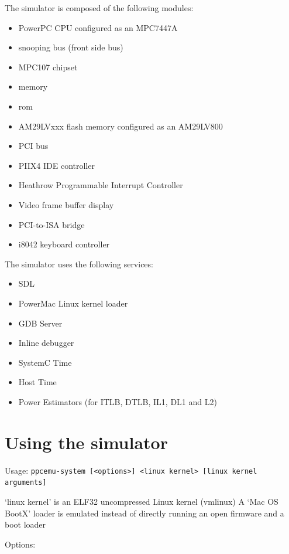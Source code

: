 The simulator is composed of the following modules:
\begin{itemize}\addtolength{\itemsep}{-0.40\baselineskip}
\item PowerPC CPU configured as an MPC7447A
\item snooping bus (front side bus)
\item MPC107 chipset
\item memory
\item rom
\item AM29LVxxx flash memory configured as an AM29LV800
\item PCI bus
\item PIIX4 IDE controller
\item Heathrow Programmable Interrupt Controller
\item Video frame buffer display
\item PCI-to-ISA bridge
\item i8042 keyboard controller
\end{itemize}

The simulator uses the following services:
\begin{itemize}\addtolength{\itemsep}{-0.40\baselineskip}
\item SDL
\item PowerMac Linux kernel loader
\item GDB Server
\item Inline debugger
\item SystemC Time
\item Host Time
\item Power Estimators (for ITLB, DTLB, IL1, DL1 and L2)
\end{itemize}

\section{Using the simulator}

Usage: \texttt{ppcemu-system [<options>] <linux kernel> [linux kernel arguments]}

‘linux kernel’ is an ELF32 uncompressed Linux kernel (vmlinux) A ‘Mac OS BootX’ loader is emulated instead of directly running an open firmware and a boot loader

Options:

